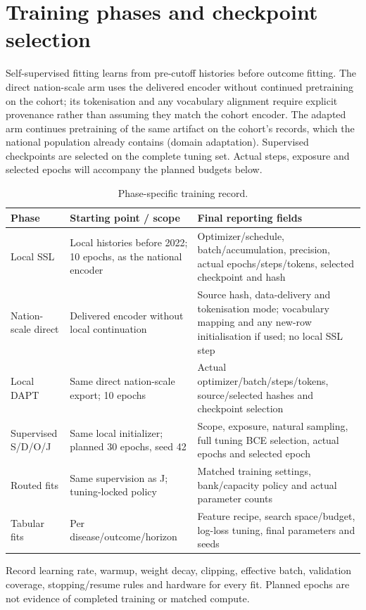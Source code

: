 \documentclass[11pt]{article}
\begin{document}
\section{Training phases and checkpoint selection}
Self-supervised fitting learns from pre-cutoff histories before outcome fitting.
The direct nation-scale arm uses the delivered encoder without continued
pretraining on the cohort; its tokenisation and any vocabulary alignment require
explicit provenance rather than assuming they match the cohort encoder. The
adapted arm continues pretraining of the same artifact on the cohort's records,
which the national population already contains (domain adaptation).
Supervised checkpoints are selected on the complete tuning set. Actual steps,
exposure and selected epochs will accompany the planned budgets below.
\begin{longtable}{L{2.4cm}L{5.5cm}L{6.3cm}}
\caption{Phase-specific training record.}\\
\toprule Phase & Starting point / scope & Final reporting fields\\\midrule\endhead
Local SSL & Local histories before 2022; 10 epochs, as the national encoder & Optimizer/schedule, batch/accumulation, precision, actual epochs/steps/tokens, selected checkpoint and hash\\
Nation-scale direct & Delivered encoder without local continuation & Source hash, data-delivery and tokenisation mode; vocabulary mapping and any new-row initialisation if used; no local SSL step\\
Local DAPT & Same direct nation-scale export; 10 epochs & Actual optimizer/batch/steps/tokens, source/selected hashes and checkpoint selection\\
Supervised S/D/O/J & Same local initializer; planned 30 epochs, seed 42 & Scope, exposure, natural sampling, full tuning BCE selection, actual epochs and selected epoch\\
Routed fits & Same supervision as J; tuning-locked policy & Matched training settings, bank/capacity policy and actual parameter counts\\
Tabular fits & Per disease/outcome/horizon & Feature recipe, search space/budget, log-loss tuning, final parameters and seeds\\\bottomrule
\end{longtable}
Record learning rate, warmup, weight decay, clipping, effective batch, validation
coverage, stopping/resume rules and hardware for every fit. Planned epochs are
not evidence of completed training or matched compute.
\end{document}
